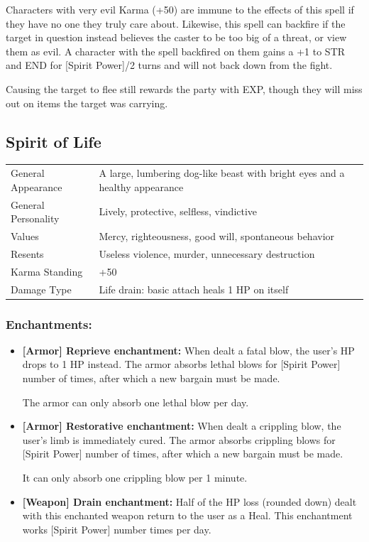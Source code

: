 \documentclass[11pt,a4paper,twocolumn]{book}
\begin{document}
Characters with very evil Karma (+50) are immune to the effects of this spell if they have no one they truly care about. Likewise, this spell can backfire if the target in question instead believes the caster to be too big of a threat, or view them as evil. A character with the spell backfired on them gains a +1 to STR and END for [Spirit Power]/2 turns and will not back down from the fight.

Causing the target to flee still rewards the party with EXP, though they will miss out on items the target was carrying.
\vfill
\pagebreak

\subsection*{Spirit of Life}
{
	\begin{tabu} to 75mm{| X[l,4] | X[l,8] |}
		\hline
		General Appearance		& A large, lumbering dog-like beast with bright eyes and a healthy appearance		\\
        General Personality	   	& Lively, protective, selfless, vindictive											\\
        Values     				& Mercy, righteousness, good will, spontaneous behavior								\\
        Resents     			& Useless violence, murder, unnecessary destruction 								\\
        Karma Standing      	& +50																				\\
        Damage Type 			& Life drain: basic attach heals 1 HP on itself	 									\\ \hline
	\end{tabu}
		
}

\medskip
\subsubsection*{Enchantments:}

\begin{itemize}
  \item \textbf{ [Armor] Reprieve enchantment:} When dealt a fatal blow, the user's HP drops to 1 HP instead. The armor absorbs lethal blows for [Spirit Power] number of times, after which a new bargain must be made.
  
The armor can only absorb one lethal blow per day.
  
  \item \textbf{ [Armor] Restorative enchantment:} When dealt a crippling blow, the user's limb is immediately cured. The armor absorbs crippling blows for [Spirit Power] number of times, after which a new bargain must be made.

It can only absorb one crippling blow per 1 minute.

\item \textbf{ [Weapon] Drain enchantment:} Half of the HP loss (rounded down) dealt with this enchanted weapon return to the user as a Heal. This enchantment works [Spirit Power] number times per day.
\end{itemize}
\end{document}
